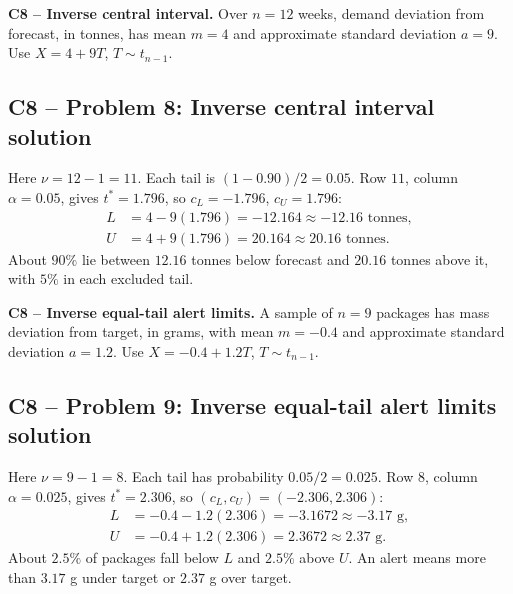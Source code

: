 {
\textbf{C8 -- Inverse central interval.} Over $n=12$ weeks, demand deviation from forecast, in tonnes, has mean $m=4$ and approximate standard deviation $a=9$. Use $X=4+9T$, $T\sim t_{n-1}$.
\label{sol:q8}
\subsection*{C8 -- Problem 8: Inverse central interval solution }
Here $\nu=12-1=11$. Each tail is $(1-0.90)/2=0.05$.
Row $11$, column $\alpha=0.05$, gives $t^*=1.796$, so $c_L=-1.796$, $c_U=1.796$:
\[
 \begin{aligned}
 L&=4-9(1.796)=-12.164\approx\boxed{-12.16\text{ tonnes}},\\
 U&=4+9(1.796)=20.164\approx\boxed{20.16\text{ tonnes}}.
 \end{aligned}
\]
About $90\%$ lie between $12.16$ tonnes below forecast and $20.16$ tonnes above it, with $5\%$ in each excluded tail.
\secInicio[sec:q8]
}

{
\textbf{C8 -- Inverse equal-tail alert limits.} A sample of $n=9$ packages has mass deviation from target, in grams, with mean $m=-0.4$ and approximate standard deviation $a=1.2$. Use $X=-0.4+1.2T$, $T\sim t_{n-1}$.
\label{sol:q9}
\subsection*{C8 -- Problem 9: Inverse equal-tail alert limits solution }
Here $\nu=9-1=8$. Each tail has probability $0.05/2=0.025$.
Row $8$, column $\alpha=0.025$, gives $t^*=2.306$, so $(c_L,c_U)=(-2.306,2.306)$:
\[
 \begin{aligned}
 L&=-0.4-1.2(2.306)=-3.1672\approx\boxed{-3.17\text{ g}},\\
 U&=-0.4+1.2(2.306)=2.3672\approx\boxed{2.37\text{ g}}.
 \end{aligned}
\]
About $2.5\%$ of packages fall below $L$ and $2.5\%$ above $U$.
An alert means more than $3.17$ g under target or $2.37$ g over target.
\secInicio[sec:q9]
}

